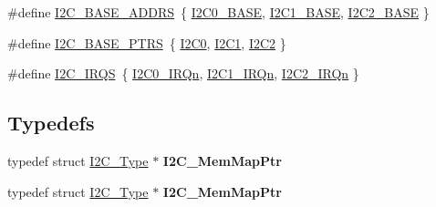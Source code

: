\begin{DoxyCompactItemize}
\item 
\#define \hyperlink{group__I2C__Peripheral__Access__Layer_gae92fd6c5f532d79f1a47e76c6dbc33f0}{I2\+C\+\_\+\+B\+A\+S\+E\+\_\+\+A\+D\+D\+RS}~\{ \hyperlink{group__I2C__Peripheral__Access__Layer_gabf0928baf4e4350633ca9050b65d1939}{I2\+C0\+\_\+\+B\+A\+SE}, \hyperlink{group__I2C__Peripheral__Access__Layer_gacd72dbffb1738ca87c838545c4eb85a3}{I2\+C1\+\_\+\+B\+A\+SE}, \hyperlink{group__I2C__Peripheral__Access__Layer_ga04bda70f25c795fb79f163b633ad4a5d}{I2\+C2\+\_\+\+B\+A\+SE} \}
\item 
\#define \hyperlink{group__I2C__Peripheral__Access__Layer_gaee17f364d6d1712b62774e6c33dea554}{I2\+C\+\_\+\+B\+A\+S\+E\+\_\+\+P\+T\+RS}~\{ \hyperlink{group__I2C__Peripheral__Access__Layer_ga86abb2e8858d177c04e60c41e9242045}{I2\+C0}, \hyperlink{group__I2C__Peripheral__Access__Layer_gab45d257574da6fe1f091cc45b7eda6cc}{I2\+C1}, \hyperlink{group__I2C__Peripheral__Access__Layer_gafa60ac20c1921ef1002083bb3e1f5d16}{I2\+C2} \}
\item 
\#define \hyperlink{group__I2C__Peripheral__Access__Layer_gaa8773ffc80a322ac3833d4ad1853185a}{I2\+C\+\_\+\+I\+R\+QS}~\{ \hyperlink{group__Interrupt__vector__numbers_gga666eb0caeb12ec0e281415592ae89083a0f1945c7372a6de732306ea3801c8e2a}{I2\+C0\+\_\+\+I\+R\+Qn}, \hyperlink{group__Interrupt__vector__numbers_gga666eb0caeb12ec0e281415592ae89083af651b1769e03e4653b1a4a7c88132398}{I2\+C1\+\_\+\+I\+R\+Qn}, \hyperlink{group__Interrupt__vector__numbers_gga666eb0caeb12ec0e281415592ae89083a0e9ff46d0a6311ca3cc43a71702d638d}{I2\+C2\+\_\+\+I\+R\+Qn} \}
\end{DoxyCompactItemize}
\subsection*{Typedefs}
\begin{DoxyCompactItemize}
\item 
typedef struct \hyperlink{structI2C__Type}{I2\+C\+\_\+\+Type} $\ast$ {\bfseries I2\+C\+\_\+\+Mem\+Map\+Ptr}\hypertarget{group__I2C__Peripheral__Access__Layer_gad005bce09c857e19746cbfd20824de62}{}\label{group__I2C__Peripheral__Access__Layer_gad005bce09c857e19746cbfd20824de62}

\item 
typedef struct \hyperlink{structI2C__Type}{I2\+C\+\_\+\+Type} $\ast$ {\bfseries I2\+C\+\_\+\+Mem\+Map\+Ptr}\hypertarget{group__I2C__Peripheral__Access__Layer_gad005bce09c857e19746cbfd20824de62}{}\label{group__I2C__Peripheral__Access__Layer_gad005bce09c857e19746cbfd20824de62}

\end{DoxyCompactItemize}


